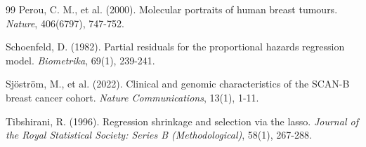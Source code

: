 \documentclass[10pt,a4paper,twocolumn]{article}
\begin{document}
\begin{thebibliography}{99}
 Perou, C. M., et al. (2000). Molecular portraits of human breast tumours. \textit{Nature}, 406(6797), 747-752.

 Schoenfeld, D. (1982). Partial residuals for the proportional hazards regression model. \textit{Biometrika}, 69(1), 239-241.

 Sjöström, M., et al. (2022). Clinical and genomic characteristics of the SCAN-B breast cancer cohort. \textit{Nature Communications}, 13(1), 1-11.

 Tibshirani, R. (1996). Regression shrinkage and selection via the lasso. \textit{Journal of the Royal Statistical Society: Series B (Methodological)}, 58(1), 267-288.

\end{thebibliography}
\end{document}
